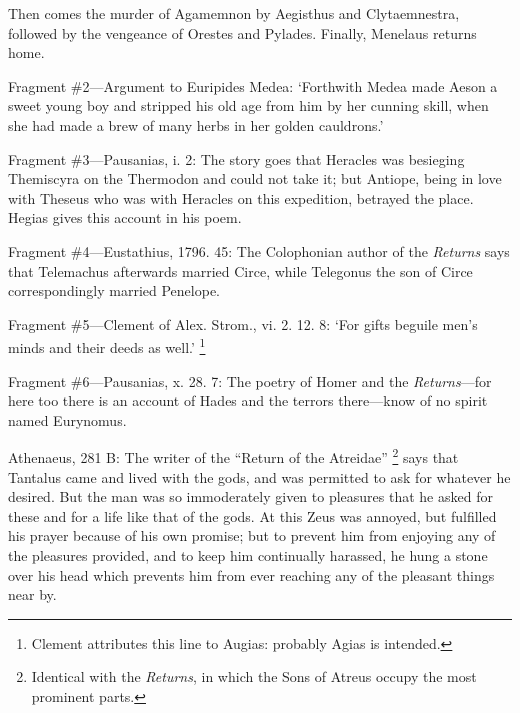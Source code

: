 Then comes the murder of Agamemnon by Aegisthus and Clytaemnestra, followed by
the vengeance of Orestes and Pylades. Finally, Menelaus returns home.

Fragment \#2—Argument to Euripides Medea: ‘Forthwith Medea made
Aeson a sweet young boy and stripped his old age from him by her cunning skill,
when she had made a brew of many herbs in her golden cauldrons.’

Fragment \#3—Pausanias, i. 2: The story goes that Heracles was besieging
Themiscyra on the Thermodon and could not take it; but Antiope, being in love
with Theseus who was with Heracles on this expedition, betrayed the place.
Hegias gives this account in his poem.

Fragment \#4—Eustathius, 1796. 45: The Colophonian author of the
\emph{Returns} says that Telemachus afterwards married Circe, while
Telegonus the son of Circe correspondingly married Penelope.

Fragment \#5—Clement of Alex. Strom., vi. 2. 12. 8: ‘For gifts
beguile men’s minds and their deeds as well.’ \footnote{Clement attributes this
line to Augias: probably Agias is intended.}

Fragment \#6—Pausanias, x. 28. 7: The poetry of Homer and the
\emph{Returns}—for here too there is an account of Hades and the
terrors there—know of no spirit named Eurynomus.

Athenaeus, 281 B: The writer of the “Return of the Atreidae” \footnote{Identical with the
\emph{Returns}, in which the Sons of Atreus occupy the most prominent
parts.} says that Tantalus came and lived
with the gods, and was permitted to ask for whatever he desired. But the man
was so immoderately given to pleasures that he asked for these and for a life
like that of the gods. At this Zeus was annoyed, but fulfilled his prayer
because of his own promise; but to prevent him from enjoying any of the
pleasures provided, and to keep him continually harassed, he hung a stone over
his head which prevents him from ever reaching any of the pleasant things near
by.


